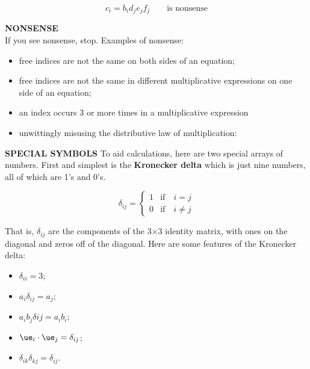 \documentclass[11pt]{article}
\def\tight{ \setlength{\itemsep}{1.5pt}\setlength{\parskip}{0pt}\setlength{\parsep}{0pt}}
\begin{document}
\begin{enumerate}
\begin{description}
 \[
 c_i = b_i d_je_j f_j \qquad \mbox{is nonsense}
 \]
 
 \end{description}
 
\medskip
\textbf{NONSENSE}
\null\\
If you see nonsense, stop.  Examples of nonsense:

\begin{itemize}
\item free indices are not the same on both sides of an equation;
\item free indices are not the same in different multiplicative expressions on one side of an equation; 
\item an index occurs 3 or more times in a multiplicative expression
\item unwittingly misusing the distributive law of multiplication:



\end{itemize}

\textbf{SPECIAL SYMBOLS}
To aid calculations, here are two special arrays of numbers. First and simplest is the \textbf{Kronecker delta} which is just nine numbers, all of which are 1's and 0's.

 \[
\delta_{ij} =
\begin{cases}
1 &\mbox{if}\quad i=j\\
0 &\mbox{if}\quad i\ne j
\end{cases}
\]

That is, $\delta_{ij}$ are the components of the 3$\times$3 identity matrix, with ones on the diagonal and zeros off of the diagonal.  Here are some features of the Kronecker delta:

\begin{itemize}
\item   $\delta_{ii} = 3$;
\item  $a_i\delta_{ij} = a_j$;
\item $a_ib_j\delta{ij} = a_ib_i$; 
\item   $\ue_i\cdot\ue_j = \delta_{ij}$;
\item $\delta_{ik}\delta_{kj} = \delta_{ij}$.
\end{itemize}


\end{enumerate}
\end{document}
